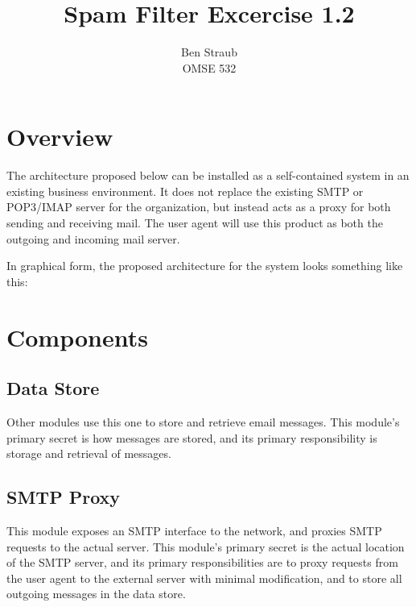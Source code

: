 \documentclass[11pt,letterpaper]{article}
\begin{document}
\author{Ben Straub\\OMSE 532}
\title{Spam Filter Excercise 1.2}
\maketitle


\section{Overview}

The architecture proposed below can be installed as a self-contained system in
an existing business environment.  It does not replace the existing SMTP or
POP3/IMAP server for the organization, but instead acts as a proxy for both
sending and receiving mail.  The user agent will use this product as both the
outgoing and incoming mail server.  

In graphical form, the proposed architecture for the system looks something
like this:

\setlength\fboxsep{0pt}
\setlength\fboxrule{0.5pt}
\begin{center}
\end{center}


\section{Components}

\subsection{Data Store}
Other modules use this one to store and retrieve email messages.  This
module's primary secret is how messages are stored, and its primary
responsibility is storage and retrieval of messages.

\subsection{SMTP Proxy}
This module exposes an SMTP interface to the network, and proxies SMTP
requests to the actual server.  This module's primary secret is the actual
location of the SMTP server, and its primary responsibilities are to proxy
requests from the user agent to the external server with minimal modification,
and to store all outgoing messages in the data store.
\end{document}
